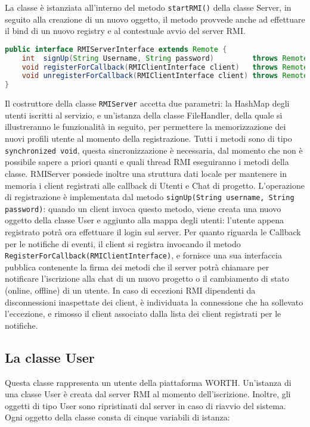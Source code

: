 \documentclass{article}
\begin{document}
La classe è istanziata all'interno del metodo \texttt{startRMI()} della classe Server, in seguito alla creazione di un nuovo oggetto, il metodo provvede anche ad effettuare il bind di un nuovo registry e al contestuale avvio del server RMI.\newline 
\begin{lstlisting}[language=Java, caption=Interfaccia \texttt{RMIServerInterface.java}]
public interface RMIServerInterface extends Remote {
    int  signUp(String Username, String password)         throws RemoteException;
    void registerForCallback(RMIClientInterface client)   throws RemoteException;
    void unregisterForCallback(RMIClientInterface client) throws RemoteException;
}
\end{lstlisting}
Il costruttore della classe \texttt{RMIServer} accetta due parametri: la HashMap degli utenti iscritti al servizio, e un'istanza della classe FileHandler, della quale si illustreranno le funzionalità in seguito, per permettere la memorizzazione dei nuovi profili utente al momento della registrazione.
Tutti i metodi sono di tipo \texttt{synchronized void}, questa sincronizzazione è necessaria, dal momento che non è possibile sapere a priori quanti e quali thread RMI eseguiranno i metodi della classe.
RMIServer possiede inoltre una struttura dati locale per mantenere in memoria i client registrati alle callback di Utenti e Chat di progetto.
L'operazione di registrazione è implementata dal metodo \texttt{signUp(String username, String password)}: quando un client invoca questo metodo, viene creata una nuovo oggetto della classe User e aggiunto alla mappa degli utenti: l'utente appena registrato potrà ora effettuare il login sul server.
Per quanto riguarda le Callback per le notifiche di eventi, il client si registra invocando il metodo \texttt{RegisterForCallback(RMIClientInterface)}, e fornisce una sua interfaccia pubblica contenente la firma dei metodi che il server potrà chiamare per notificare l'iscrizione alla chat di un nuovo progetto o il cambiamento di stato (online, offline) di un utente. 
In caso di eccezioni RMI dipendenti da disconnessioni inaspettate dei client, è individuata la connessione che ha sollevato l'eccezione, e rimosso il client associato dalla lista dei client registrati per le notifiche.

\subsection{La classe User}
Questa classe rappresenta un utente della piattaforma WORTH. Un'istanza di una classe User è creata dal server RMI al momento dell'iscrizione. Inoltre, gli oggetti di tipo User sono ripristinati dal server in caso di riavvio del sistema.\newline
Ogni oggetto della classe consta di cinque variabili di istanza: 
\end{document}
